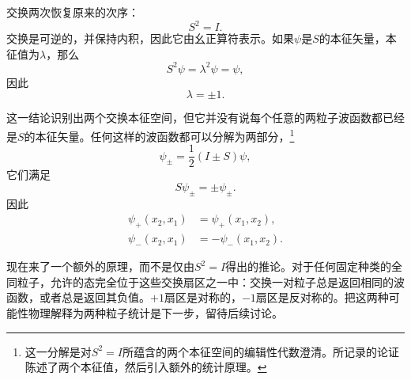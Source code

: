 交换两次恢复原来的次序：
\begin{equation}
S^{2}=I.
\end{equation}
交换是可逆的，并保持内积，因此它由幺正算符表示。如果\(\psi\)是\(S\)的本征矢量，本征值为\(\lambda\)，那么
\[
S^{2}\psi=\lambda^{2}\psi=\psi,
\]
因此
\begin{equation}
\lambda=\pm1.
\end{equation}

这一结论识别出两个交换本征空间，但它并没有说每个任意的两粒子波函数都已经是\(S\)的本征矢量。任何这样的波函数都可以分解为两部分，\footnote{这一分解是对\(S^{2}=I\)所蕴含的两个本征空间的编辑性代数澄清。所记录的论证陈述了两个本征值，然后引入额外的统计原理。}
\begin{equation}
\psi_{\pm}=\frac12(I\pm S)\psi,
\end{equation}
它们满足
\begin{equation}
S\psi_{\pm}=\pm\psi_{\pm}.
\end{equation}
因此
\begin{align}
\psi_{+}(x_{2},x_{1})&=\psi_{+}(x_{1},x_{2}),\\
\psi_{-}(x_{2},x_{1})&=-\psi_{-}(x_{1},x_{2}).
\end{align}

现在来了一个额外的原理，而不是仅由\(S^{2}=I\)得出的推论。对于任何固定种类的全同粒子，允许的态完全位于这些交换扇区之一中：交换一对粒子总是返回相同的波函数，或者总是返回其负值。\(+1\)扇区是对称的，\(-1\)扇区是反对称的。把这两种可能性物理解释为两种粒子统计是下一步，留待后续讨论。
